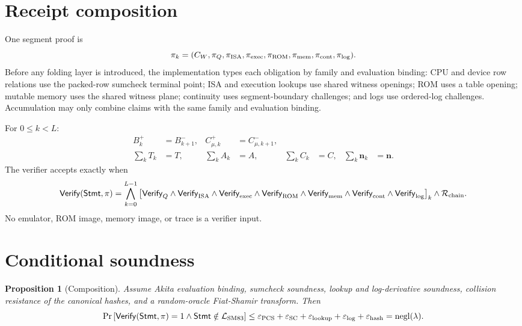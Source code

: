\documentclass[10pt]{article}
\numberwithin{equation}{section}
\newcommand{\Verify}{\mathsf{Verify}}
\newcommand{\Stmt}{\mathsf{Stmt}}
\newcommand{\Rel}{\mathcal{R}}
\newcommand{\Lang}{\mathcal{L}}
\DeclareMathOperator{\negl}{negl}
\newtheorem{proposition}{Proposition}
\begin{document}
\section{Receipt composition}

One segment proof is
\begin{equation}
 \pi_k=(C_W,\pi_Q,\pi_{\rm ISA},\pi_{\rm exec},\pi_{\rm ROM},
             \pi_{\rm mem},\pi_{\rm cont},\pi_{\rm log}).
 \label{eq:segment-proof}
\end{equation}
Before any folding layer is introduced, the implementation types each obligation by family and
evaluation binding: CPU and device row relations use the packed-row sumcheck terminal point; ISA
and execution lookups use shared witness openings; ROM uses a table opening; mutable memory uses
the shared witness plane; continuity uses segment-boundary challenges; and logs use ordered-log
challenges.  Accumulation may only combine claims with the same family and evaluation binding.

For $0\le k<L$:
\begin{align}
 B_{k}^{+}&=B_{k+1}^{-},&
 C_{\mu,k}^{+}&=C_{\mu,k+1}^{-},\\
 \sum_k T_k&=T,&
 \sum_k A_k&=A,&
 \sum_k C_k&=C,&
 \sum_k\mathbf n_k&=\mathbf n.
 \label{eq:segment-chain}
\end{align}
The verifier accepts exactly when
\begin{equation}
 \Verify(\Stmt,\pi)=
 \bigwedge_{k=0}^{L-1}\left[
 \Verify_Q\wedge\Verify_{\rm ISA}\wedge\Verify_{\rm exec}\wedge
 \Verify_{\rm ROM}\wedge\Verify_{\rm mem}\wedge\Verify_{\rm cont}\wedge
 \Verify_{\rm log}\right]_k
 \wedge\Rel_{\rm chain}.
 \label{eq:verification}
\end{equation}
No emulator, ROM image, memory image, or trace is a verifier input.

\section{Conditional soundness}

\begin{proposition}[Composition]
Assume Akita evaluation binding, sumcheck soundness, lookup and log-derivative soundness,
collision resistance of the canonical hashes, and a random-oracle Fiat-Shamir transform.
Then
\begin{equation}
 \Pr\left[\Verify(\Stmt,\pi)=1\wedge\Stmt\notin\Lang_{\rm SM83}\right]
 \le \varepsilon_{\rm PCS}+\varepsilon_{\rm SC}+\varepsilon_{\rm lookup}
 +\varepsilon_{\rm log}+\varepsilon_{\rm hash}=\negl(\lambda).
 \label{eq:soundness}
\end{equation}
\end{proposition}
\end{document}
